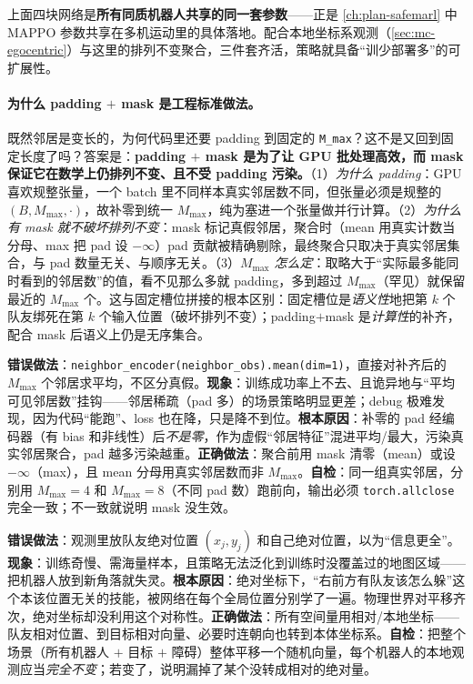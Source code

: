 \noindent 上面四块网络是\textbf{所有同质机器人共享的同一套参数}——正是 \cref{ch:plan-safemarl} 中 MAPPO 参数共享在多机运动里的具体落地。配合本地坐标系观测（\cref{sec:mc-egocentric}）与这里的排列不变聚合，三件套齐活，策略就具备“训少部署多”的可扩展性。

\paragraph{为什么 padding $+$ mask 是工程标准做法。}
既然邻居是变长的，为何代码里还要 padding 到固定的 \verb|M_max|？这不是又回到固定长度了吗？答案是：\textbf{padding $+$ mask 是为了让 GPU 批处理高效，而 mask 保证它在数学上仍排列不变、且不受 padding 污染。}（1）\emph{为什么 padding}：GPU 喜欢规整张量，一个 batch 里不同样本真实邻居数不同，但张量必须是规整的 $(B,M_{\max},\cdot)$，故补零到统一 $M_{\max}$，纯为塞进一个张量做并行计算。（2）\emph{为什么有 mask 就不破坏排列不变}：mask 标记真假邻居，聚合时（mean 用真实计数当分母、max 把 pad 设 $-\infty$）pad 贡献被精确剔除，最终聚合只取决于真实邻居集合，与 pad 数量无关、与顺序无关。（3）\emph{$M_{\max}$ 怎么定}：取略大于“实际最多能同时看到的邻居数”的值，看不见那么多就 padding，多到超过 $M_{\max}$（罕见）就保留最近的 $M_{\max}$ 个。这与固定槽位拼接的根本区别：固定槽位是\emph{语义性}地把第 $k$ 个队友绑死在第 $k$ 个输入位置（破坏排列不变）；padding$+$mask 是\emph{计算性}的补齐，配合 mask 后语义上仍是无序集合。

\begin{pitfall}
\textbf{错误做法}：\verb|neighbor_encoder(neighbor_obs).mean(dim=1)|，直接对补齐后的 $M_{\max}$ 个邻居求平均，不区分真假。\textbf{现象}：训练成功率上不去、且诡异地与“平均可见邻居数”挂钩——邻居稀疏（pad 多）的场景策略明显更差；debug 极难发现，因为代码“能跑”、loss 也在降，只是降不到位。\textbf{根本原因}：补零的 pad 经编码器（有 bias 和非线性）后\emph{不是零}，作为虚假“邻居特征”混进平均/最大，污染真实邻居聚合，pad 越多污染越重。\textbf{正确做法}：聚合前用 mask 清零（mean）或设 $-\infty$（max），且 mean 分母用真实邻居数而非 $M_{\max}$。\textbf{自检}：同一组真实邻居，分别用 $M_{\max}{=}4$ 和 $M_{\max}{=}8$（不同 pad 数）跑前向，输出必须 \verb|torch.allclose| 完全一致；不一致就说明 mask 没生效。
\end{pitfall}

\begin{pitfall}
\textbf{错误做法}：观测里放队友绝对位置 $(x_j,y_j)$ 和自己绝对位置，以为“信息更全”。\textbf{现象}：训练奇慢、需海量样本，且策略无法泛化到训练时没覆盖过的地图区域——把机器人放到新角落就失灵。\textbf{根本原因}：绝对坐标下，“右前方有队友该怎么躲”这个本该位置无关的技能，被网络在每个全局位置分别学了一遍。物理世界对平移齐次，绝对坐标却没利用这个对称性。\textbf{正确做法}：所有空间量用相对/本地坐标——队友相对位置、到目标相对向量、必要时连朝向也转到本体坐标系。\textbf{自检}：把整个场景（所有机器人 $+$ 目标 $+$ 障碍）整体平移一个随机向量，每个机器人的本地观测应当\emph{完全不变}；若变了，说明漏掉了某个没转成相对的绝对量。
\end{pitfall}

